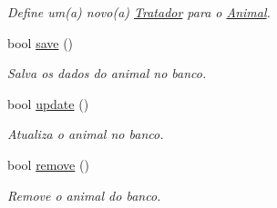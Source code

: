 \begin{DoxyCompactItemize}
\begin{DoxyCompactList}\small\item\em Define um(a) novo(a) \hyperlink{classTratador}{Tratador} para o \hyperlink{classAnimal}{Animal}. \end{DoxyCompactList}\item 
bool \hyperlink{classAnimal_a0733e9c19d226749195ebe9e64df8964}{save} ()
\begin{DoxyCompactList}\small\item\em Salva os dados do animal no banco. \end{DoxyCompactList}\item 
bool \hyperlink{classAnimal_a2b9de87e4f753fc9f92aeb012bf098c5}{update} ()
\begin{DoxyCompactList}\small\item\em Atualiza o animal no banco. \end{DoxyCompactList}\item 
bool \hyperlink{classAnimal_a0aea60eaeb4d8f1d68d2c37e279d2d20}{remove} ()
\begin{DoxyCompactList}\small\item\em Remove o animal do banco. \end{DoxyCompactList}\end{DoxyCompactItemize}
